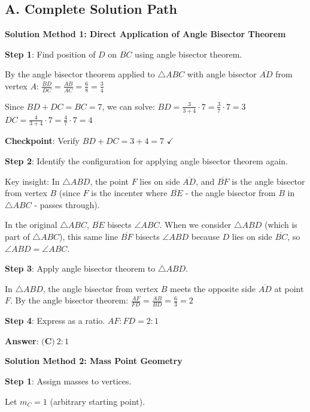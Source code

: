 \documentclass[12pt]{article}
\begin{document}
\begin{roadmapbox}
\subsection*{A. Complete Solution Path}

\textbf{Solution Method 1: Direct Application of Angle Bisector Theorem}

\textbf{Step 1}: Find position of $D$ on $\overline{BC}$ using angle bisector theorem.

By the angle bisector theorem applied to $\triangle ABC$ with angle bisector $\overline{AD}$ from vertex $A$:
$\frac{BD}{DC} = \frac{AB}{AC} = \frac{6}{8} = \frac{3}{4}$

Since $BD + DC = BC = 7$, we can solve:
$BD = \frac{3}{3+4} \cdot 7 = \frac{3}{7} \cdot 7 = 3$
$DC = \frac{4}{3+4} \cdot 7 = \frac{4}{7} \cdot 7 = 4$

\textbf{Checkpoint}: Verify $BD + DC = 3 + 4 = 7$ $\checkmark$

\textbf{Step 2}: Identify the configuration for applying angle bisector theorem again.

Key insight: In $\triangle ABD$, the point $F$ lies on side $\overline{AD}$, and $\overline{BF}$ is the angle bisector from vertex $B$ (since $F$ is the incenter where $\overline{BE}$ - the angle bisector from $B$ in $\triangle ABC$ - passes through).

In the original $\triangle ABC$, $\overline{BE}$ bisects $\angle ABC$. When we consider $\triangle ABD$ (which is part of $\triangle ABC$), this same line $\overline{BF}$ bisects $\angle ABD$ because $D$ lies on side $\overline{BC}$, so $\angle ABD = \angle ABC$.

\textbf{Step 3}: Apply angle bisector theorem to $\triangle ABD$.

In $\triangle ABD$, the angle bisector from vertex $B$ meets the opposite side $\overline{AD}$ at point $F$. By the angle bisector theorem:
$\frac{AF}{FD} = \frac{AB}{BD} = \frac{6}{3} = 2$

\textbf{Step 4}: Express as a ratio.
$AF : FD = 2 : 1$

\textbf{Answer}: $\boxed{\textbf{(C)}\ 2:1}$

\vspace{0.3cm}

\textbf{Solution Method 2: Mass Point Geometry}

\textbf{Step 1}: Assign masses to vertices.

Let $m_C = 1$ (arbitrary starting point).


\end{roadmapbox}
\end{document}
